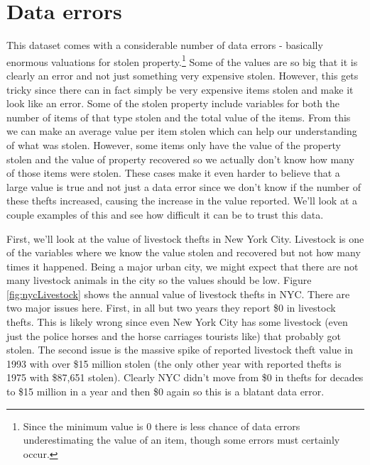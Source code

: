 \documentclass[
]{krantz}
\begin{document}
\section{Data errors}\label{data-errors}

This dataset comes with a considerable number of data errors
- basically enormous valuations for stolen
property.\footnote{Since the minimum value is 0 there is
  less chance of data errors underestimating the value of an
  item, though some errors must certainly occur.} Some of
the values are so big that it is clearly an error and not
just something very expensive stolen. However, this gets
tricky since there can in fact simply be very expensive
items stolen and make it look like an error. Some of the
stolen property include variables for both the number of
items of that type stolen and the total value of the items.
From this we can make an average value per item stolen which
can help our understanding of what was stolen. However, some
items only have the value of the property stolen and the
value of property recovered so we actually don't know how
many of those items were stolen. These cases make it even
harder to believe that a large value is true and not just a
data error since we don't know if the number of these thefts
increased, causing the increase in the value reported. We'll
look at a couple examples of this and see how difficult it
can be to trust this data.

First, we'll look at the value of livestock thefts in New
York City. Livestock is one of the variables where we know
the value stolen and recovered but not how many times it
happened. Being a major urban city, we might expect that
there are not many livestock animals in the city so the
values should be low. Figure \ref{fig:nycLivestock} shows
the annual value of livestock thefts in NYC. There are two
major issues here. First, in all but two years they report
\$0 in livestock thefts. This is likely wrong since even New
York City has some livestock (even just the police horses
and the horse carriages tourists like) that probably got
stolen. The second issue is the massive spike of reported
livestock theft value in 1993 with over \$15 million stolen
(the only other year with reported thefts is 1975 with
\$87,651 stolen). Clearly NYC didn't move from \$0 in thefts
for decades to \$15 million in a year and then \$0 again so
this is a blatant data error.
\end{document}
